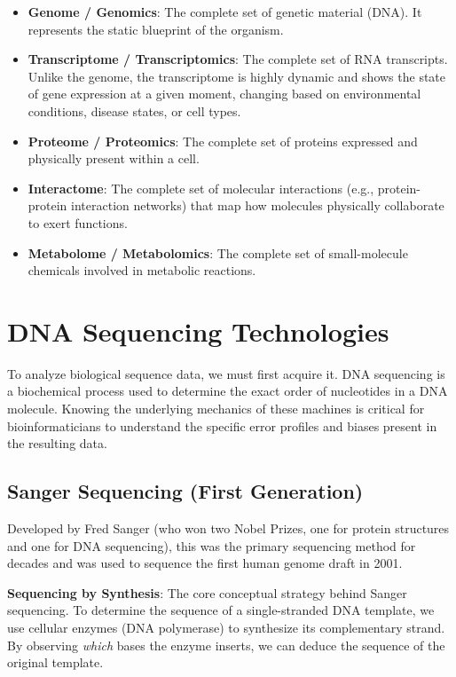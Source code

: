 \begin{itemize}
  \item \textbf{Genome / Genomics}: The complete set of genetic material (DNA). It represents the static blueprint of the organism.
  \item \textbf{Transcriptome / Transcriptomics}: The complete set of RNA transcripts. \sta Unlike the genome, the transcriptome is highly dynamic and shows the state of gene expression at a given moment, changing based on environmental conditions, disease states, or cell types.
  \item \textbf{Proteome / Proteomics}: The complete set of proteins expressed and physically present within a cell.
  \item \textbf{Interactome}: The complete set of molecular interactions (e.g., protein-protein interaction networks) that map how molecules physically collaborate to exert functions.
  \item \textbf{Metabolome / Metabolomics}: The complete set of small-molecule chemicals involved in metabolic reactions.
\end{itemize}

\section{DNA Sequencing Technologies}

To analyze biological sequence data, we must first acquire it. DNA sequencing is a biochemical process used to determine the exact order of nucleotides in a DNA molecule. Knowing the underlying mechanics of these machines is critical for bioinformaticians to understand the specific error profiles and biases present in the resulting data.

\subsection{Sanger Sequencing (First Generation)}
Developed by Fred Sanger (who won two Nobel Prizes, one for protein structures and one for DNA sequencing), this was the primary sequencing method for decades and was used to sequence the first human genome draft in 2001.

\begin{important}
  \textbf{Sequencing by Synthesis}: The core conceptual strategy behind Sanger sequencing. To determine the sequence of a single-stranded DNA template, we use cellular enzymes (DNA polymerase) to synthesize its complementary strand. By observing \textit{which} bases the enzyme inserts, we can deduce the sequence of the original template.
\end{important}

